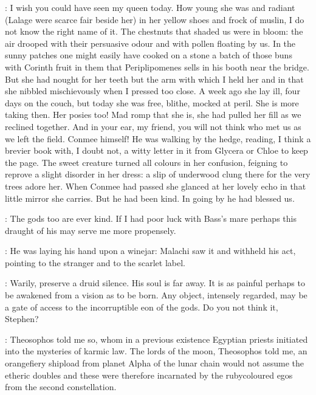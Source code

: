 \lynch:
I wish you could have seen my queen today.
How young she was and radiant
(Lalage were scarce fair beside her)
in her yellow shoes and frock of muslin,
I do not know the right name of it.
The chestnuts that shaded us were in bloom:
the air drooped with their persuasive odour and with pollen floating by us.
In the sunny patches one might easily have cooked on a stone a batch of those buns
with Corinth fruit in them that Periplipomenes sells in his booth near the bridge.
But she had nought for her teeth but the arm with which I held her
and in that she nibbled mischievously when I pressed too close.
A week ago she lay ill,
four days on the couch,
but today she was free,
blithe,
mocked at peril.
She is more taking then.
Her posies too!
Mad romp that she is,
she had pulled her fill as we reclined together.
And in your ear,
my friend,
you will not think who met us as we left the field.
Conmee himself!
He was walking by the hedge,
reading,
I think a brevier book with,
I doubt not,
a witty letter in it from Glycera or Chloe to keep the page.
The sweet creature turned all colours in her confusion,
feigning to reprove a slight disorder in her dress:
a slip of underwood
clung there for the very trees adore her.
When Conmee had passed she
glanced at her lovely echo in that little mirror she carries.
But he had been kind.
In going by he had blessed us.

\lenehan:
The gods too are ever kind.
If I had poor luck with Bass's mare perhaps this draught of
his may serve me more propensely.

:
He was laying his hand upon a winejar:
Malachi saw it and withheld his act,
pointing to the stranger and to the
scarlet label.

\mulligan:
 Warily,
preserve a druid silence.
His soul is far away.
It is as painful perhaps to be awakened from a vision
as to be born.
Any object,
intensely regarded,
may be a gate of access to
the incorruptible eon of the gods.
Do you not think it,
Stephen?

\stephen:
Theosophos told me so,
whom in a previous existence
Egyptian priests initiated into the mysteries of karmic law.
The lords of the moon,
Theosophos told me,
an orangefiery shipload from planet Alpha
of the lunar chain would not assume the etheric doubles and these were
therefore incarnated by the rubycoloured egos from the second
constellation.



